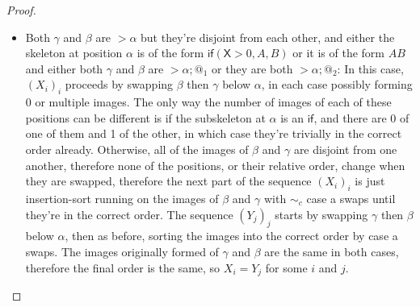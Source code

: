 \documentclass{article}
\newcommand{\tif}[3]{\mathsf{if}(#1, #2, #3)} %
\newcommand{\skeletonPlaceholder}{\mathsf{X}} %
\theoremstyle{definition}
\theoremstyle{lemma}
\theoremstyle{remark}
\begin{document}
\begin{proof}
\begin{itemize}
\item Both $\gamma$ and $\beta$ are $> \alpha$ but they're disjoint from each other, and either the skeleton at position $\alpha$ is of the form $\tif{\skeletonPlaceholder > 0}{A}{B}$ or it is of the form $A B$ and either both $\gamma$ and $\beta$ are $> \alpha;@_1$ or they are both $> \alpha;@_2$: In this case, $(X_i)_i$ proceeds by swapping $\beta$ then $\gamma$ below $\alpha$, in each case possibly forming 0 or multiple images. The only way the number of images of each of these positions can be different is if the subskeleton at $\alpha$ is an $\textsf{if}$, and there are 0 of one of them and 1 of the other, in which case they're trivially in the correct order already. Otherwise, all of the images of $\beta$ and $\gamma$ are disjoint from one another, therefore none of the positions, or their relative order, change when they are swapped, therefore the next part of the sequence $(X_i)_i$ is just insertion-sort running on the images of $\beta$ and $\gamma$ with $\sim_c$ case a swaps until they're in the correct order. The sequence $(Y_j)_j$ starts by swapping $\gamma$ then $\beta$ below $\alpha$, then as before, sorting the images into the correct order by case a swaps. The images originally formed of $\gamma$ and $\beta$ are the same in both cases, therefore the final order is the same, so $X_i = Y_j$ for some $i$ and $j$.

\end{itemize}
\end{proof}
\end{document}
